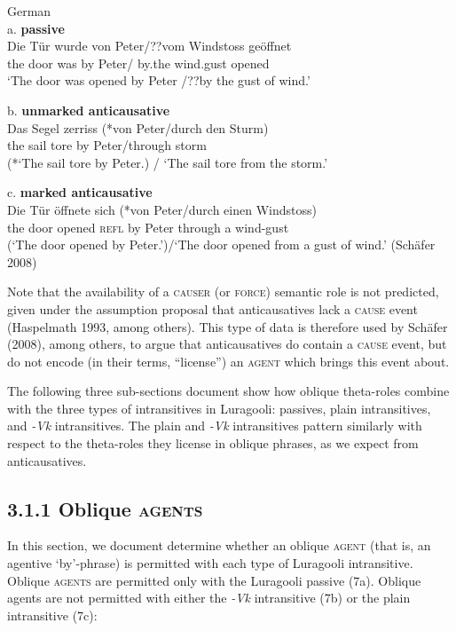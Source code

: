 \documentclass[output=paper]{langsci/langscibook}
\begin{document}
\ea
{  German}\\
{a. \textbf{passive}}\\
\gll   Die Tür wurde von Peter/??vom      Windstoss  geöffnet\\
       the door was    by   Peter/     by.the  wind.gust   opened\\
\glt ‘The door was opened by Peter /??by the gust of wind.’
\z

\ea
{b. \textbf{unmarked anticausative}}\\
\gll   Das Segel zerriss (*von Peter/durch den Sturm)\\
       the  sail    tore        by    Peter/through storm\\
\glt (*‘The sail tore by Peter.) / ‘The sail tore from the storm.’ 
\z

\ea
{c. \textbf{marked anticausative}}\\
\gll   Die Tür   öffnete sich (*von Peter/durch einen Windstoss)\\
       the door opened \textsc{refl}  by   Peter  through a wind-gust\\
\glt (‘The door opened by Peter.’)/‘The door opened from a gust of wind.’      (Schäfer 2008)
\z

Note that the availability of a \textsc{causer} (or \textsc{force}) semantic role is not predicted, given under the assumption proposal that anticausatives lack a\textsc{ cause }event (Haspelmath 1993, among others). This type of data is therefore used by Schäfer (2008), among others, to argue that anticausatives do contain a \textsc{cause} event, but do not encode (in their terms, “license”) an \textsc{agent} which brings this event about. 

The following three sub-sections document show how oblique theta-roles combine with the three types of intransitives in Luragooli: passives, plain intransitives, and \textit{{}-Vk} intransitives. The plain and \textit{{}-Vk} intransitives pattern similarly with respect to the theta-roles they license in oblique phrases, as we expect from anticausatives.

\subsection{3.1.1 Oblique \textsc{agents} }

In this section, we document determine whether an oblique \textsc{agent} (that is, an agentive ‘by’-phrase) is permitted with each type of Luragooli intransitive. Oblique \textsc{agents} are permitted only with the Luragooli passive (7a). Oblique agents are not permitted with either the \textit{{}-Vk} intransitive (7b) or the plain intransitive (7c):
\end{document}
